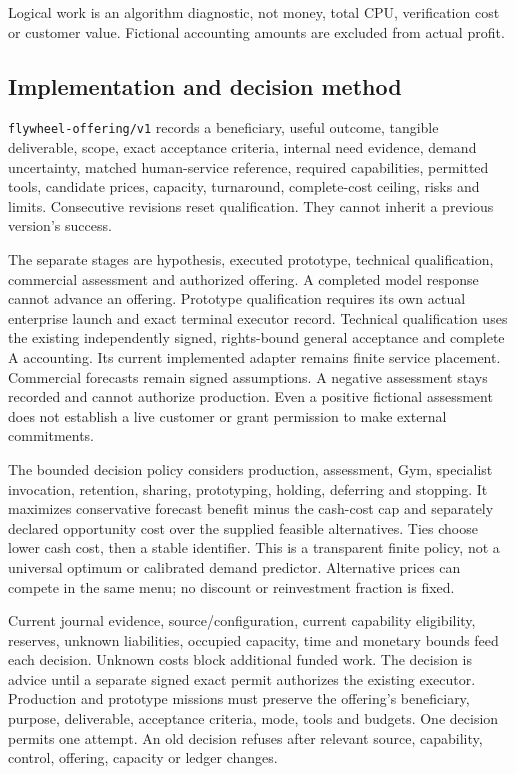 \documentclass[
  10pt,
]{article}
\begin{document}
Logical work is an algorithm diagnostic, not money, total CPU,
verification cost or customer value. Fictional accounting amounts are
excluded from actual profit.

\hypertarget{implementation-and-decision-method}{%
\subsection{Implementation and decision
method}\label{implementation-and-decision-method}}

\texttt{flywheel-offering/v1} records a beneficiary, useful outcome,
tangible deliverable, scope, exact acceptance criteria, internal need
evidence, demand uncertainty, matched human-service reference, required
capabilities, permitted tools, candidate prices, capacity, turnaround,
complete-cost ceiling, risks and limits. Consecutive revisions reset
qualification. They cannot inherit a previous version's success.

The separate stages are hypothesis, executed prototype, technical
qualification, commercial assessment and authorized offering. A
completed model response cannot advance an offering. Prototype
qualification requires its own actual enterprise launch and exact
terminal executor record. Technical qualification uses the existing
independently signed, rights-bound general acceptance and complete A
accounting. Its current implemented adapter remains finite service
placement. Commercial forecasts remain signed assumptions. A negative
assessment stays recorded and cannot authorize production. Even a
positive fictional assessment does not establish a live customer or
grant permission to make external commitments.

The bounded decision policy considers production, assessment, Gym,
specialist invocation, retention, sharing, prototyping, holding,
deferring and stopping. It maximizes conservative forecast benefit minus
the cash-cost cap and separately declared opportunity cost over the
supplied feasible alternatives. Ties choose lower cash cost, then a
stable identifier. This is a transparent finite policy, not a universal
optimum or calibrated demand predictor. Alternative prices can compete
in the same menu; no discount or reinvestment fraction is fixed.

Current journal evidence, source/configuration, current capability
eligibility, reserves, unknown liabilities, occupied capacity, time and
monetary bounds feed each decision. Unknown costs block additional
funded work. The decision is advice until a separate signed exact permit
authorizes the existing executor. Production and prototype missions must
preserve the offering's beneficiary, purpose, deliverable, acceptance
criteria, mode, tools and budgets. One decision permits one attempt. An
old decision refuses after relevant source, capability, control,
offering, capacity or ledger changes.
\end{document}
